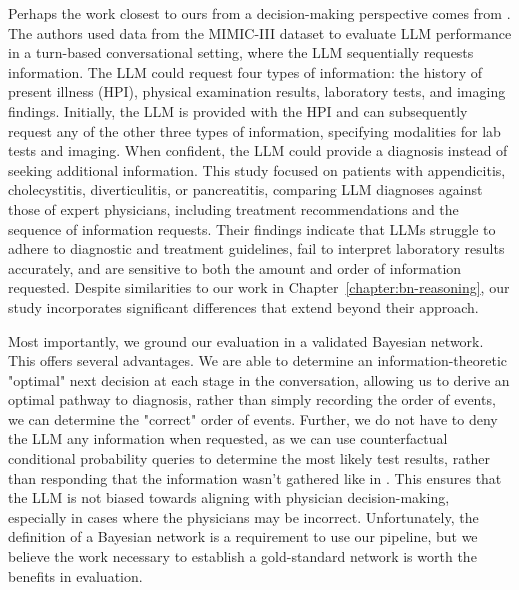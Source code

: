 Perhaps the work closest to ours from a decision-making perspective comes from \citet{hagerEvaluationMitigationLimitations2024}. The authors used data from the MIMIC-III dataset to evaluate LLM performance in a turn-based conversational setting, where the LLM sequentially requests information. The LLM could request four types of information: the history of present illness (HPI), physical examination results, laboratory tests, and imaging findings. Initially, the LLM is provided with the HPI and can subsequently request any of the other three types of information, specifying modalities for lab tests and imaging. When confident, the LLM could provide a diagnosis instead of seeking additional information. This study focused on patients with appendicitis, cholecystitis, diverticulitis, or pancreatitis, comparing LLM diagnoses against those of expert physicians, including treatment recommendations and the sequence of information requests. Their findings indicate that LLMs struggle to adhere to diagnostic and treatment guidelines, fail to interpret laboratory results accurately, and are sensitive to both the amount and order of information requested. Despite similarities to our work in Chapter~\ref{chapter:bn-reasoning}, our study incorporates significant differences that extend beyond their approach.

Most importantly, we ground our evaluation in a validated Bayesian network. This offers several advantages. We are able to determine an information-theoretic "optimal" next decision at each stage in the conversation, allowing us to derive an optimal pathway to diagnosis, rather than simply recording the order of events, we can determine the "correct" order of events. Further, we do not have to deny the LLM any information when requested, as we can use counterfactual conditional probability queries to determine the most likely test results, rather than responding that the information wasn't gathered like in \citet{hagerEvaluationMitigationLimitations2024}. This ensures that the LLM is not biased towards aligning with physician decision-making, especially in cases where the physicians may be incorrect. Unfortunately, the definition of a Bayesian network is a requirement to use our pipeline, but we believe the work necessary to establish a gold-standard network is worth the benefits in evaluation. 

